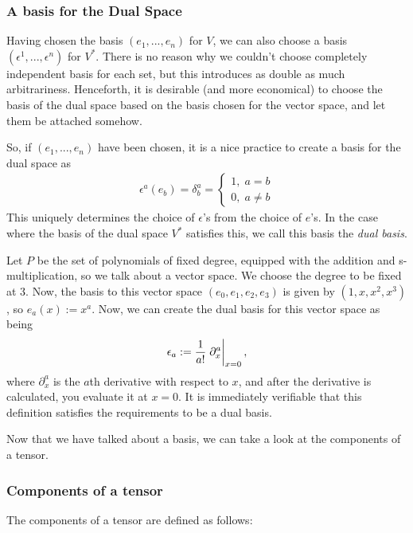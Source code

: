 \subsubsection{A basis for the Dual Space}
Having chosen the basis $(e_1, ..., e_n)$ for $V$, we can also choose a basis $(\epsilon^1, ..., \epsilon^n)$ for $V^*$. There is no reason why we couldn't choose completely independent basis for each set, but this introduces as double as much arbitrariness. Henceforth, it is desirable (and more economical) to choose the basis of the dual space based on the basis chosen for the vector space, and let them be attached somehow. 

So, if $(e_1, ..., e_n)$ have been chosen, it is a nice practice to create a basis for the dual space as
\begin{align*}
    \epsilon^a(e_b) = \delta_b^a = \left\{
    \begin{array}{c}
    1, \; a = b  \\
    0, \; a \neq b
    \end{array}
    \right.
\end{align*}
This uniquely determines the choice of $\epsilon$'s from the choice of $e$'s. In the case where the basis of the dual space $V^*$ satisfies this, we call this basis the \emph{dual basis}.

\begin{example}
    Let $P$ be the set of polynomials of fixed degree, equipped with the addition and s-multiplication, so we talk about a vector space. We choose the degree to be fixed at 3. Now, the basis to this vector space $(e_0, e_1, e_2, e_3)$ is given by $(1, x, x^2, x^3)$, so $e_a (x) := x^a$. Now, we can create the dual basis for this vector space as being
    \[
        \epsilon_a := \frac{1}{a!} \eval{\partial_x^a}_{x=0},
    \]
    where $\partial_x^a$ is the $a$th derivative with respect to $x$, and after the derivative is calculated, you evaluate it at $x=0$. It is immediately verifiable that this definition satisfies the requirements to be a dual basis.
    \qedwhite
\end{example}

Now that we have talked about a basis, we can take a look at the components of a tensor.

\subsubsection{Components of a tensor}
The components of a tensor are defined as follows:

